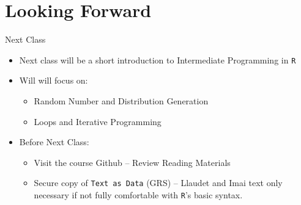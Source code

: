 \documentclass[
  ignorenonframetext,
]{beamer}
\providecommand{\tightlist}{%
  \setlength{\itemsep}{0pt}\setlength{\parskip}{0pt}}
\begin{document}
\section{Looking Forward}\label{looking-forward}

\begin{frame}{Next Class}
\label{next-class}
\begin{itemize}
\tightlist
\item
  Next class will be a short introduction to Intermediate Programming in
  \texttt{R}

  \par \vspace{2.5mm}
\item
  Will will focus on:

  \begin{itemize}
  \tightlist
  \item
    Random Number and Distribution Generation
  \item
    Loops and Iterative Programming
  \end{itemize}
\end{itemize}

\par \vspace{2.5mm}

\begin{itemize}
\tightlist
\item
  Before Next Class:

  \begin{itemize}
  \tightlist
  \item
    Visit the course Github -- Review Reading Materials
  \item
    Secure copy of \texttt{Text as Data} (GRS) -- Llaudet and Imai text
    only necessary if not fully comfortable with \texttt{R}'s basic
    syntax.
  \end{itemize}
\end{itemize}
\end{frame}
\end{document}
